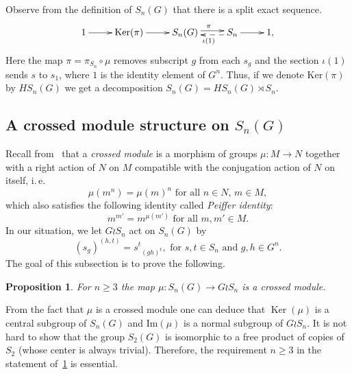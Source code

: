 \documentclass[oneside, 12pt]{amsart}
\theoremstyle{plain}
\numberwithin{equation}{section}
\numberwithin{lemma}{section}
\newtheorem{prop}[lemma]{Proposition}
\theoremstyle{remark}
\theoremstyle{definition}
\DeclareMathOperator{\Ker}{Ker}
\begin{document}
Observe from the definition of $S_n(G)$ that there is a split exact sequence.
\begin{equation} \label{eq:ex-seq} \xymatrix{1 \ar[r] & \mathrm{Ker}(\pi) \ar[r] &  S_n(G) \ar@<0.5ex>[r]^{\pi} & S_n \ar[r] \ar@{-->}@<0.5ex>[l]^{\iota(1)} & 1,} \end{equation}
Here the map $\pi = \pi_{S_n} \circ \mu$ removes subscript $g$ from each $s_g$ and the section $\iota(1)$ sends $s$ to $s_1$, where $1$ is the identity element of $G^n$.
Thus, if we denote $\mathrm{Ker}(\pi)$ by $HS_n(G)$ we get a decomposition $S_n(G) = HS_n(G) \rtimes S_n$.

\subsection{A crossed module structure on $S_n(G)$}
Recall from~\cite[\S~2.2]{BHS11} that a {\it crossed module} is a morphism of groups $\mu\colon M\to N$ together with a right action of $N$ on $M$ 
compatible with the conjugation action of $N$ on itself, i.\,e.
\begin{equation} \label{eq:precrossed} \tag{CM1} \mu(m^n) = \mu(m)^n \text{ for all $n \in N$, $m \in M$}, \end{equation}
which also satisfies the following identity called {\it Peiffer identity}:
\begin{equation} \label{eq:Peiffer} \tag{CM2} m^{m'} = m^{\mu(m')} \text{ for all $m, m' \in M$}.\end{equation}
In our situation, we let $G \wr S_n$ act on $S_n(G)$ by 
\begin{equation} \label{eq:action} (s_g)^{(h, t)} = {s^t}_{(gh)^t}, \text{ for $s, t \in S_n$ and $g, h \in G^n$.} \end{equation}
The goal of this subsection is to prove the following.
\begin{prop} \label{thm:cms} For $n \geq 3$ the map $\mu \colon S_n(G) \to G \wr S_n $ is a crossed module. \end{prop}
From the fact that $\mu$ is a crossed module one can deduce that $\Ker(\mu)$ is a central subgroup of $S_n(G)$ and $\mathrm{Im}(\mu)$ is a normal subgroup of $G \wr S_n$.
It is not hard to show that the group $S_2(G)$ is isomorphic to a free product of copies of $S_2$ (whose center is always trivial).
Therefore, the requirement $n\geq 3$ in the statement of~\cref{thm:cms} is essential.

\end{document}
